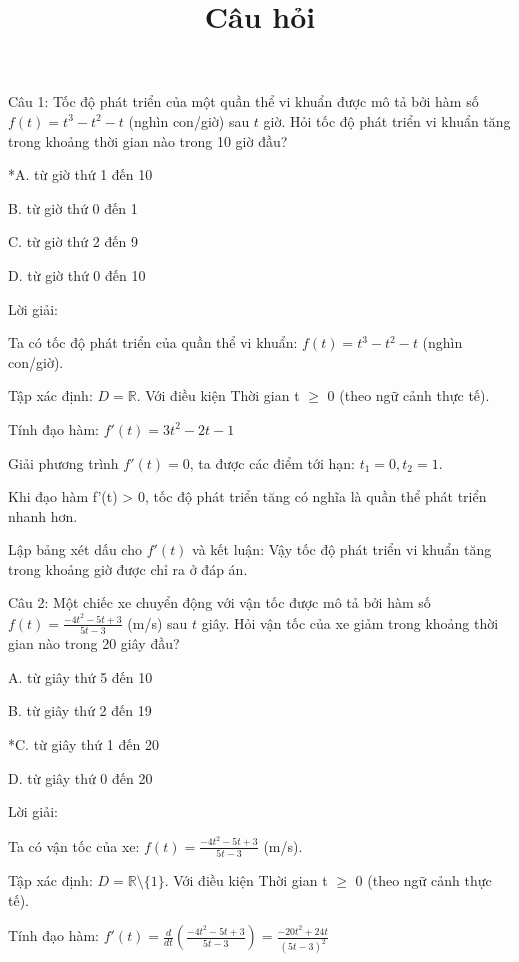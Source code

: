 \documentclass[a4paper,12pt]{article}
\begin{document}
\title{Câu hỏi}
\maketitle

Câu 1: Tốc độ phát triển của một quần thể vi khuẩn được mô tả bởi hàm số \(f(t) = t^{3}- t^{2}- t\) (nghìn con/giờ) sau \(t\) giờ. 
            Hỏi tốc độ phát triển vi khuẩn tăng trong khoảng thời gian nào trong 10 giờ đầu?

*A. từ giờ thứ 1 đến 10

B. từ giờ thứ 0 đến 1

C. từ giờ thứ 2 đến 9

D. từ giờ thứ 0 đến 10

Lời giải:

Ta có tốc độ phát triển của quần thể vi khuẩn: \(f(t) = t^{3}- t^{2}- t\) (nghìn con/giờ).

Tập xác định: \(D = \mathbb{R}\).
Với điều kiện Thời gian t $\geq$ 0 (theo ngữ cảnh thực tế).

Tính đạo hàm:
\(f'(t) = 3t^{2}- 2t- 1\)

Giải phương trình \(f'(t) = 0\), ta được các điểm tới hạn:
\(t_1 = 0, t_2 = 1\).



Khi đạo hàm f'(t) > 0, tốc độ phát triển tăng có nghĩa là quần thể phát triển nhanh hơn.

Lập bảng xét dấu cho \(f'(t)\) và kết luận: Vậy tốc độ phát triển vi khuẩn tăng trong khoảng giờ được chỉ ra ở đáp án.



Câu 2: Một chiếc xe chuyển động với vận tốc được mô tả bởi hàm số \(f(t) = \frac{-4t^2-5t+3}{5t-3}\) (m/s) sau \(t\) giây. 
            Hỏi vận tốc của xe giảm trong khoảng thời gian nào trong 20 giây đầu?

A. từ giây thứ 5 đến 10

B. từ giây thứ 2 đến 19

*C. từ giây thứ 1 đến 20

D. từ giây thứ 0 đến 20

Lời giải:

Ta có vận tốc của xe: \(f(t) = \frac{-4t^2-5t+3}{5t-3}\) (m/s).

Tập xác định: \(D = \mathbb{R} \setminus \{1\}\).
Với điều kiện Thời gian t $\geq$ 0 (theo ngữ cảnh thực tế).

Tính đạo hàm:
\(f'(t) = \frac{d}{dt}\left(\frac{-4t^2-5t+3}{5t-3}\right) = \frac{-20t^2+24t}{\left(5t-3\right)^2}\)
\end{document}

